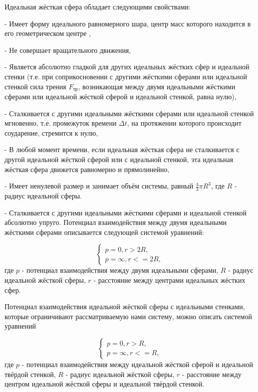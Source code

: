 \documentclass{article}
\begin{document}
Идеальная жёсткая сфера обладает следующими свойствами:

 - Имеет форму идеального равномерного шара, центр масс которого находится в его геометрическом центре \cite{Dzonkali_1989_Physics_T1},
 
 - Не совершает вращательного движения, 
 
 - Является абсолютно гладкой для других идеальных жёстких сфер и идеальной стенки (т.е. при соприкосновении с другими жёсткими сферами или идеальной стенкой сила трения $ F_{тр} $, возникающая между двумя идеальными жёсткими сферами или идеальной жёсткой сферой и идеальной стенкой, равна нулю),
 
 - Сталкивается с другими идеальными жёсткими сферами или идеальной стенкой мгновенно, т.е. промежуток времени $ \Delta t $, на протяжении которого происходит соударение, стремится к нулю,
 
 - В любой момент времени, если идеальная жёсткая сфера не сталкивается с другой идеальной жёсткой сферой или с идеальной стенкой, эта идеальная жёсткая сфера движется равномерно и прямолинейно, 
 
 - Имеет ненулевой размер и занимает объём системы, равный $ \frac{4}{3} \pi R^3 $, где $ R $ - радиус идеальной сферы. 
 
 - Сталкивается с другими идеальными жёсткими сферами и идеальной стенкой абсолютно упруго. Потенциал взаимодействия между двумя идеальными жёсткими сферами описывается следующей системой уравнений:

\begin{equation}\label{eq:rule_of_potential_between_two_particles}
    \begin{cases}
        p = 0, r > 2R,
        \\
        p = \infty, r <= 2R,
    \end{cases}
\end{equation}
где $ p $ - потенциал взаимодействия между двумя идеальными сферами, $ R $ - радиус идеальной жёсткой сферы, $ r $ - расстояние между центрами  идеальных жёстких сфер. 

Потенциал взаимодействия идеальной жёсткой сферы с идеальными стенками, которые ограничивают рассматриваемую нами систему, можно описать системой уравнений

\begin{equation}\label{eq:rule_of_potential_between_particles_and_walls}
    \begin{cases}
        p = 0, r > R,
        \\
        p = \infty, r <= R,
    \end{cases}
\end{equation}
где $ p $ - потенциал взаимодействия между идеальной жёсткой сферой и идеальной твёрдой стенкой, $ R $ - радиус идеальной жёсткой сферы, $ r $ - расстояние между центром идеальной жёсткой сферы и идеальной твёрдой стенкой.
\end{document}
